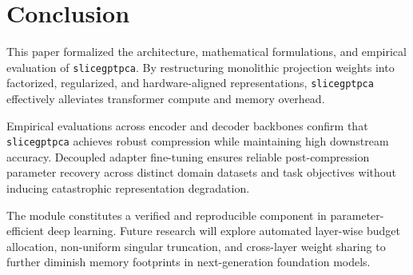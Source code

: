 \section{Conclusion}
This paper formalized the architecture, mathematical formulations, and empirical evaluation of \texttt{slicegptpca}. By restructuring monolithic projection weights into factorized, regularized, and hardware-aligned representations, \texttt{slicegptpca} effectively alleviates transformer compute and memory overhead.

Empirical evaluations across encoder and decoder backbones confirm that \texttt{slicegptpca} achieves robust compression while maintaining high downstream accuracy. Decoupled adapter fine-tuning ensures reliable post-compression parameter recovery across distinct domain datasets and task objectives without inducing catastrophic representation degradation.

The module constitutes a verified and reproducible component in parameter-efficient deep learning. Future research will explore automated layer-wise budget allocation, non-uniform singular truncation, and cross-layer weight sharing to further diminish memory footprints in next-generation foundation models.
